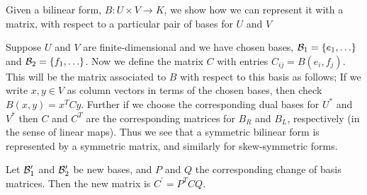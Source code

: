 \documentclass[12pt]{article}
\begin{document}
Given a bilinear form, $B : U \times V \rightarrow K$, we show how we can represent it with a matrix, with respect to a particular pair of bases for $U$ and $V$

Suppose $U$ and $V$ are finite-dimensional and we have chosen bases, ${{\cal B}_1} = \{e_1, \ldots\}$ and ${{\cal B}_2}=\{f_1, \ldots\}$. Now we define the matrix $C$ with entries $C_{ij} = B(e_i, f_j)$. This will be the matrix associated to $B$ with respect to this basis as follows; If we write $x,y \in V$ as column vectors in terms of the chosen bases, then check $B(x,y) = x^T C y$. Further if we choose the corresponding dual bases for $U^\ast$ and $V^\ast$ then $C$ and $C^T$ are the corresponding matrices for $B_R$ and $B_L$, respectively (in the sense of linear maps). Thus we see that a symmetric bilinear form is represented by a symmetric matrix, and similarly for skew-symmetric forms.

Let ${{\cal B}_1^\prime}$ and ${{\cal B}_2^\prime}$ be new bases, and $P$ and $Q$ the corresponding change of basis matrices. Then the new matrix is $C^\prime = P^{T}CQ$.
\end{document}
